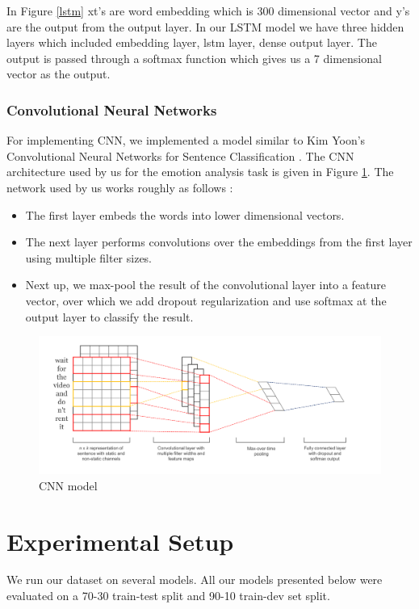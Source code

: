 \documentclass[conference]{IEEEtran}
\numberwithin{equation}{section}
\numberwithin{figure}{section}
\numberwithin{table}{section}
\begin{document}
In Figure \ref{lstm} xt's are word embedding which is 300 dimensional vector and y's are the output from the output layer. In our LSTM model we have three hidden layers which included embedding layer, lstm layer, dense output layer. The output is passed through a softmax function which gives us a 7 dimensional vector as the output. 


\subsubsection{Convolutional Neural Networks}
For implementing CNN, we implemented a model similar to Kim Yoon's Convolutional Neural Networks for Sentence Classification \cite{kimyoon} \cite{wildmlcnn}.
The CNN architecture used by us for the emotion analysis task is given in Figure \ref{fig_cnn}. The network used by us works roughly as follows : 
\begin{itemize}
\item The first layer embeds the words into lower dimensional vectors.
\item The next layer performs convolutions over the embeddings from the first layer using multiple filter sizes.
\item Next up, we max-pool the result of the convolutional layer into a feature vector, over which we add dropout regularization and use softmax at the output layer to classify the result.
\end{itemize}


\begin{figure}
  \centering
  \includegraphics[width=\columnwidth]{cnn_arch}
  \caption{CNN model}
    \label{fig_cnn}
\end{figure}

\section{Experimental Setup}
We run our dataset on several models. 
All our models presented below were evaluated on a 70-30 train-test split and 90-10 train-dev set split.
\end{document}
